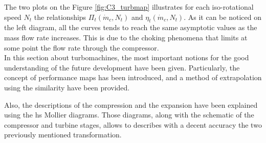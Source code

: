 The two plots on the Figure \ref{fig:C3_turbmap} illustrates for each iso-rotational speed $N_t$ the relationships $\Pi_t(\dot{m}_c,N_t)$ and $\eta_t(\dot{m}_c,N_t)$. As it can be noticed on the left diagram, all the curves tends to reach the same asymptotic values as the mass flow rate increases. This is due to the choking phenomena that limits at some point the flow rate through the compressor.\\

In this section about turbomachines, the most important notions for the good understanding of the future development have been given. Particularly, the concept of performance maps has been introduced, and a method of extrapolation using the similarity have been provided. 

Also, the descriptions of the compression and the expansion have been explained using the hs Mollier diagrams. Those diagrams, along with the schematic of the compressor and turbine stages, allows to describes with a decent accuracy the two previously mentioned transformation. 
\newpage